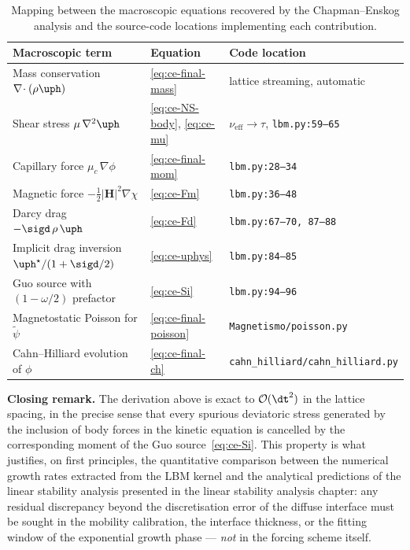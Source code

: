 \begin{table}[H]
\centering
\small
\begin{tabular}{lll}
\toprule
\textbf{Macroscopic term} & \textbf{Equation} & \textbf{Code location} \\
\midrule
Mass conservation $\nabla\!\cdot(\rho\uph)$ & \eqref{eq:ce-final-mass} & lattice streaming, automatic \\
Shear stress $\mu\,\nabla^{2}\uph$ & \eqref{eq:ce-NS-body}, \eqref{eq:ce-mu} & $\nu_{\mathrm{eff}} \to \tau$, \texttt{lbm.py:59--65} \\
Capillary force $\mu_c\,\nabla\phi$ & \eqref{eq:ce-final-mom} & \texttt{lbm.py:28--34} \\
Magnetic force $-\tfrac{1}{2}|\bm{H}|^{2}\nabla\chi$ & \eqref{eq:ce-Fm} & \texttt{lbm.py:36--48} \\
Darcy drag $-\sigd\,\rho\,\uph$ & \eqref{eq:ce-Fd} & \texttt{lbm.py:67--70, 87--88} \\
Implicit drag inversion $\uph^{\star}/(1+\sigd/2)$ & \eqref{eq:ce-uphys} & \texttt{lbm.py:84--85} \\
Guo source with $(1-\omega/2)$ prefactor & \eqref{eq:ce-Si} & \texttt{lbm.py:94--96} \\
Magnetostatic Poisson for $\tilde{\psi}$ & \eqref{eq:ce-final-poisson} & \texttt{Magnetismo/poisson.py} \\
Cahn--Hilliard evolution of $\phi$ & \eqref{eq:ce-final-ch} & \texttt{cahn\_hilliard/cahn\_hilliard.py} \\
\bottomrule
\end{tabular}
\caption{Mapping between the macroscopic equations recovered by the Chapman--Enskog analysis and the source-code locations implementing each contribution.}
\label{tab:ce-mapping}
\end{table}

\noindent\textbf{Closing remark.} 
The derivation above is exact to $\mathcal{O}(\dt^{2})$ in the lattice spacing, in the precise sense that every spurious deviatoric stress generated by the inclusion of body forces in the kinetic equation is cancelled by the corresponding moment of the Guo source~\eqref{eq:ce-Si}.
This property is what justifies, on first principles, the quantitative comparison between the numerical growth rates extracted from the LBM kernel and the analytical predictions of the linear stability analysis presented in the linear stability analysis chapter: any residual discrepancy beyond the discretisation error of the diffuse interface must be sought in the mobility calibration, the interface thickness, or the fitting window of the exponential growth phase --- \emph{not} in the forcing scheme itself.

